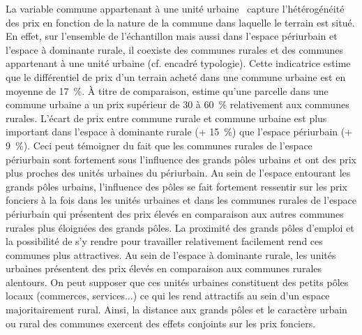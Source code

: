 \documentclass[10.5pt,a4paper]{article}
\begin{document}
{La variable \og commune appartenant à une unité urbaine \fg~capture l'hétérogénéité des prix en fonction de la nature de la commune dans laquelle le terrain est situé. En effet, sur l'ensemble de l'échantillon mais aussi dans l'espace périurbain et l'espace à dominante rurale, il coexiste des communes rurales et des communes appartenant à une unité urbaine (cf. encadré typologie). Cette indicatrice estime que le différentiel de prix d'un terrain acheté dans une commune urbaine est en moyenne de 17~\%. \`{A} titre de comparaison, \cite{Goffette09} estime qu'une parcelle dans une commune urbaine a un prix supérieur de 30 à 60~\% relativement aux communes rurales. L'écart de prix entre commune rurale et commune urbaine est plus important dans l'espace à dominante rurale (+ 15~\%) que l'espace périurbain  (+ 9~\%). Ceci peut témoigner du fait que les communes rurales de l'espace périurbain sont fortement sous l'influence des grands pôles urbains et ont des prix plus proches des unités urbaines du périurbain. Au sein de l'espace entourant les grands pôles urbains, l'influence des pôles se fait fortement ressentir sur les prix fonciers à la fois dans les unités urbaines et dans les communes rurales de l'espace périurbain qui présentent des prix élevés en comparaison aux autres communes rurales plus éloignées des grands pôles. La proximité des grands pôles d'emploi et la possibilité de s'y rendre pour travailler relativement facilement rend ces communes plus attractives. Au sein de l'espace à dominante rurale, les unités urbaines présentent des prix élevés en comparaison aux communes rurales alentours. On peut supposer que ces unités urbaines constituent des petits pôles locaux (commerces, services...) ce qui les rend attractifs au sein d'un espace majoritairement rural. Ainsi, la distance aux grands pôles et le caractère urbain ou rural des communes exercent des effets conjoints sur les prix fonciers.\par   

}
\end{document}
